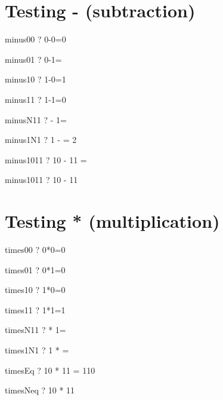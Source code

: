 \documentclass{article}
\begin{document}
\section{Testing - (subtraction)}
\begin{theorem}{minus00}  \vdash?   0-0=0 \end{theorem}
\begin{theorem}{minus01}  \vdash?   0-1=  \end{theorem}
\begin{theorem}{minus10}  \vdash?   1-0=1 \end{theorem}
\begin{theorem}{minus11}  \vdash?   1-1=0 \end{theorem}
\begin{theorem}{minusN11} \vdash?    - 1=  \end{theorem}
\begin{theorem}{minus1N1} \vdash?   1 -  = 2 \end{theorem}
\begin{theorem}{minus1011} \vdash?   10 - 11 =  \end{theorem}
\begin{theorem}{minus1011} \vdash?   10 - 11  \end{theorem}


\section{Testing * (multiplication)}
\begin{theorem}{times00}  \vdash?   0*0=0 \end{theorem}
\begin{theorem}{times01}  \vdash?   0*1=0 \end{theorem}
\begin{theorem}{times10}  \vdash?   1*0=0 \end{theorem}
\begin{theorem}{times11}  \vdash?   1*1=1 \end{theorem}
\begin{theorem}{timesN11} \vdash?    * 1=  \end{theorem}
\begin{theorem}{times1N1} \vdash?   1 *  =  \end{theorem}
\begin{theorem}{timesEq}  \vdash?   10 * 11 = 110 \end{theorem}
\begin{theorem}{timesNeq} \vdash?   10 * 11  \end{theorem}
\end{document}
